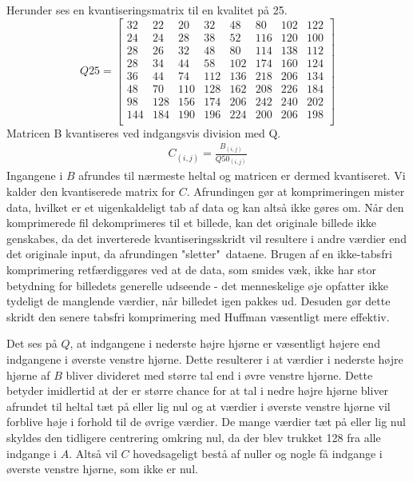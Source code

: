 Herunder ses en kvantiseringsmatrix til en kvalitet på 25.
\begin{equation}
Q25 =
\begin{bmatrix}
	32	&	22	& 20		& 32		& 	48	&	80	& 102	& 122	\\
	24	&	24	& 28		& 38		& 	52	& 	116	& 120	& 100	\\
	28	&	26	& 32		& 48		& 	80	& 	114	& 138	& 112	\\
	28	&	34	& 44		& 58		& 	102	& 	174	& 160	& 124	\\
	36	&	44	& 74		& 112	& 	136	& 	218	& 206	& 134	\\
	48	&	70	& 110	& 128	& 	162	& 	208	& 226	& 184	\\
	98	&	128	& 156	& 174	& 	206	& 	242	& 240	& 202	\\
	144	&	184	& 190	& 196	& 	224	& 	200	& 206	& 198	\\
\end{bmatrix}
\label{eq:Q25teori}
\end{equation}
Matricen B kvantiseres ved indgangsvis division med Q.
\begin{align}
C_{(i,j)}=\frac{B_{(i,j)}}{Q50_(i,j)}
\end{align}
Ingangene i $B$ afrundes til nærmeste heltal og matricen er dermed kvantiseret. Vi kalder den kvantiserede matrix for $C$. Afrundingen gør at komprimeringen mister data, hvilket er et uigenkaldeligt tab af data og kan altså ikke gøres om. Når den komprimerede fil dekomprimeres til et billede, kan det originale billede ikke genskabes, da det inverterede kvantiseringsskridt vil resultere i andre værdier end det originale input, da afrundingen "sletter"\ dataene. Brugen af en ikke-tabsfri komprimering retfærdiggøres ved at de data, som smides væk, ikke har stor betydning for billedets generelle udseende - det menneskelige øje opfatter ikke tydeligt de manglende værdier, når billedet igen pakkes ud. Desuden gør dette skridt den senere tabsfri komprimering med Huffman væsentligt mere effektiv.

Det ses på $Q$, at indgangene i nederste højre hjørne er væsentligt højere end indgangene i øverste venstre hjørne. Dette resulterer i at værdier i nederste højre hjørne af $B$ bliver divideret med større tal end i øvre venstre hjørne. Dette betyder imidlertid at der er større chance for at tal i nedre højre hjørne bliver afrundet til heltal tæt på eller lig nul og at værdier i øverste venstre hjørne vil forblive høje i forhold til de øvrige værdier. De mange værdier tæt på eller lig nul skyldes den tidligere centrering omkring nul, da der blev trukket 128 fra alle indgange i $A$. Altså vil $C$ hovedsageligt bestå af nuller og nogle få indgange i øverste venstre hjørne, som ikke er nul.
					
